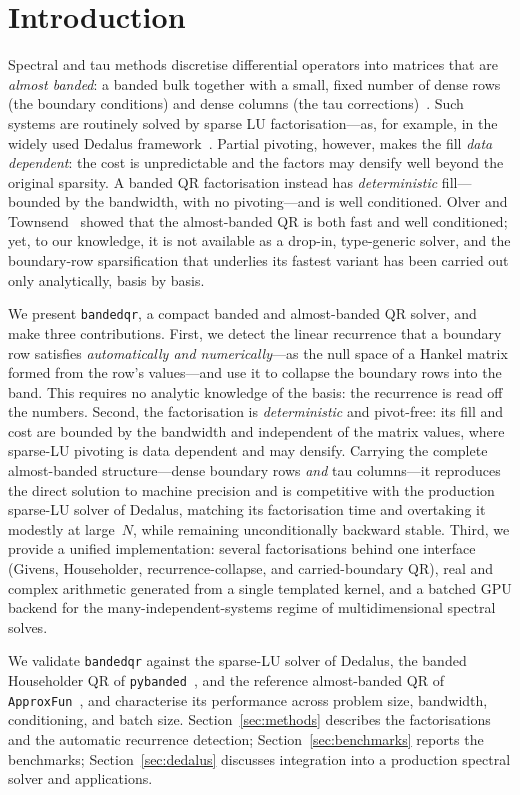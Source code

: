 \section{Introduction}

Spectral and tau methods discretise differential operators into matrices that are
\emph{almost banded}: a banded bulk together with a small, fixed number of dense
rows (the boundary conditions) and dense columns (the tau
corrections)~\cite{olver2013}. Such systems are routinely solved by sparse LU
factorisation---as, for example, in the widely used Dedalus
framework~\cite{burns2020}. Partial pivoting, however, makes the fill
\emph{data dependent}: the cost is unpredictable and the factors may densify well
beyond the original sparsity. A banded QR factorisation instead has
\emph{deterministic} fill---bounded by the bandwidth, with no pivoting---and is
well conditioned. Olver and Townsend~\cite{olver2013} showed that the almost-banded
QR is both fast and well conditioned; yet, to our knowledge, it is not available as
a drop-in, type-generic solver, and the boundary-row sparsification that
underlies its fastest variant has been carried out only analytically, basis by
basis.

We present \texttt{bandedqr}, a compact banded and almost-banded QR solver, and make
three contributions. First, we detect the linear recurrence that a boundary row
satisfies \emph{automatically and numerically}---as the null space of a Hankel
matrix formed from the row's values---and use it to collapse the boundary rows into
the band. This requires no analytic knowledge of the basis: the recurrence is read
off the numbers. Second, the factorisation is \emph{deterministic} and pivot-free:
its fill and cost are bounded by the bandwidth and independent of the matrix values,
where sparse-LU pivoting is data dependent and may densify. Carrying the complete
almost-banded structure---dense boundary rows \emph{and} tau columns---it reproduces
the direct solution to machine precision and is competitive with the production
sparse-LU solver of Dedalus, matching its factorisation time and overtaking it
modestly at large~$N$, while remaining unconditionally backward stable. Third, we
provide a unified
implementation: several factorisations behind one interface (Givens, Householder,
recurrence-collapse, and carried-boundary QR), real and complex arithmetic generated
from a single templated kernel, and a batched GPU backend for the
many-independent-systems regime of multidimensional spectral solves.

We validate \texttt{bandedqr} against the sparse-LU solver of Dedalus, the banded
Householder QR of \texttt{pybanded}~\cite{pybanded}, and the reference almost-banded
QR of \texttt{ApproxFun}~\cite{olver_approxfun}, and characterise its performance
across problem size, bandwidth, conditioning, and batch size. Section~\ref{sec:methods} describes the factorisations and the automatic
recurrence detection; Section~\ref{sec:benchmarks} reports the benchmarks;
Section~\ref{sec:dedalus} discusses integration into a production spectral solver and
applications.
